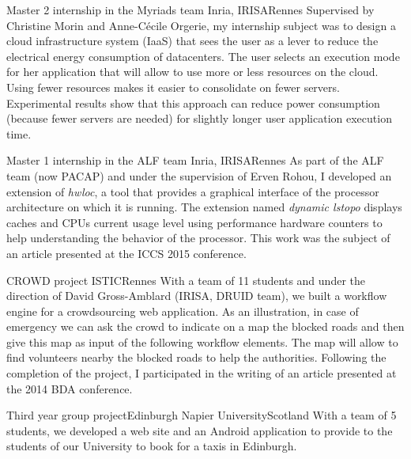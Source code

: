 \documentclass[11pt,a4paper]{moderncv}
\begin{document}
  {Master 2 internship in the Myriads team}
  {Inria, IRISA}{Rennes}{}
  {Supervised by Christine Morin and Anne-Cécile Orgerie, my internship subject was to design a cloud infrastructure system (IaaS) that sees the user as a lever to reduce the electrical energy consumption of datacenters. The user selects an execution mode for her application that will allow to use more or less resources on the cloud. Using fewer resources makes it easier to consolidate on fewer servers. Experimental results show that this approach can reduce power consumption (because fewer servers are needed) for slightly longer user application execution time.}
\vspace{0.6em}

  {Master 1 internship in the ALF team}
  {Inria, IRISA}{Rennes}{}
  {As part of the ALF team (now PACAP) and under the supervision of Erven Rohou, I developed an extension of \textit{hwloc}, a tool that provides a graphical interface of the processor architecture on which it is running. The extension named \textit{dynamic lstopo} displays caches and CPUs current usage level using performance hardware counters to help understanding the behavior of the processor. This work was the subject of an article presented at the ICCS 2015 conference.}
\vspace{0.6em}

  {CROWD project}
  {ISTIC}{Rennes}{}
  {With a team of 11 students and under the direction of David Gross-Amblard (IRISA, DRUID team), we built a workflow engine for a crowdsourcing web application. As an illustration, in case of emergency we can ask the crowd to indicate on a map the blocked roads and then give this map as input of the following workflow elements. The map will allow to find volunteers nearby the blocked roads to help the authorities. Following the completion of the project, I participated in the writing of an article presented at the 2014 BDA conference.}
\vspace{0.6em}
  
  {Third year group project}{Edinburgh Napier University}{Scotland}{}
  {With a team of 5 students, we developed a web site and an Android application to provide to the students of our University to book for a taxis in Edinburgh.}
\vspace{0.6em}
  
\end{document}
